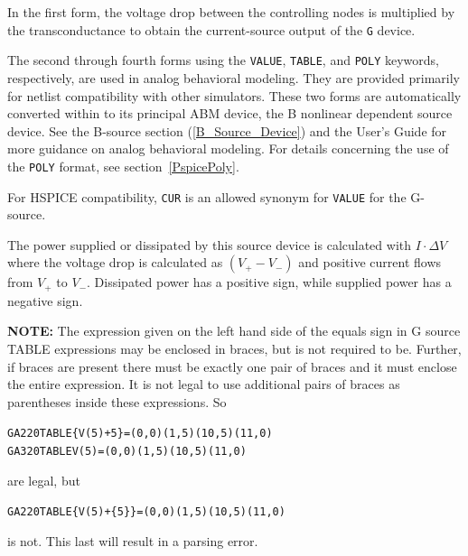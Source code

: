 \begin{Device}
\begin{Parameters}
\end{Parameters}

\comments

In the first form, the voltage drop between the controlling nodes is
multiplied by the transconductance to obtain the current-source
output of the \texttt{G} device. 

The second through fourth forms using the \texttt{VALUE}, \texttt{TABLE}, and
\texttt{POLY} keywords, respectively, are used in analog behavioral modeling.
They are provided primarily for netlist compatibility with other simulators.
These two forms are automatically converted within \Xyce{} to its principal ABM
device, the B nonlinear dependent source device. See the B-source section
(\ref{B_Source_Device}) and the \Xyce{} User's Guide for more guidance on
analog behavioral modeling.  For details concerning the use of the
\texttt{POLY} format, see section~\ref{PspicePoly}.

For HSPICE compatibility, \texttt{CUR} is an allowed synonym for
\texttt{VALUE} for the G-source.

The power supplied or dissipated by this source device is calculated 
with $I \cdot \Delta V$ where the voltage drop is calculated as $(V_+ - V_-)$ 
and positive current flows from $V_+$ to $V_-$.  Dissipated power has a
positive sign, while supplied power has a negative sign.

{\bf NOTE:} The expression given on the left hand side of the equals
sign in G source TABLE expressions may be enclosed in braces, but is
not required to be.  Further, if braces are present there must be
exactly one pair of braces and it must enclose the entire expression.
It is not legal to use additional pairs of braces as parentheses
inside these expressions.  So
\begin{alltt}
GA2 2 0 TABLE \{V(5)+5\} = (0,0) (1,5) (10,5) (11,0)
GA3 2 0 TABLE V(5) = (0,0) (1,5) (10,5) (11,0)
\end{alltt}
are legal, but
\begin{alltt}
GA2 2 0 TABLE \{V(5)+\{5\}\} = (0,0) (1,5) (10,5) (11,0)
\end{alltt}
is not.  This last will result in a parsing error.
\end{Device}
